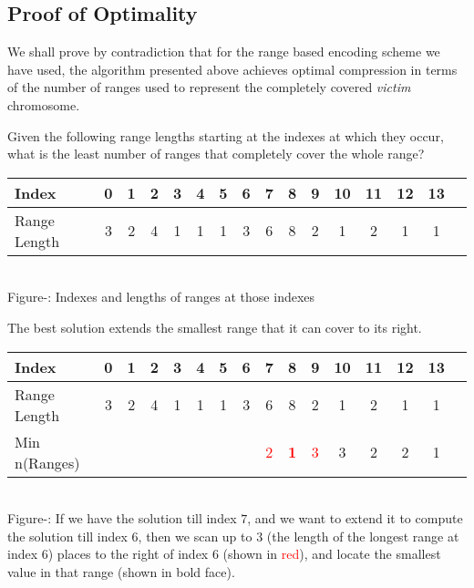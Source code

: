 \documentclass[11pt]{article}
\newcounter{fignum}
\begin{document}
\subsection{Proof of Optimality}

We shall prove by contradiction that for the range based encoding
scheme we have used, the algorithm presented above achieves optimal
compression in terms of the number of ranges used to represent the
completely covered \textit{victim} chromosome.

Given the following range lengths starting at the indexes at which
they occur, what is the least number of ranges that completely cover
the whole range?

\begin{center}
  \begin{tabular}{|l|c|c|c|c|c|c|c|c|c|c|c|c|c|c|c|}
    \hline
    Index        & 0 & 1 & 2 & 3 & 4 & 5 & 6 & 7 & 8 & 9 &10 &11 &12 &13\\
    \hline
    Range Length & 3 & 2 & 4 & 1 & 1 & 1 & 3 & 6 & 8 & 2 & 1 & 2 & 1 & 1\\
    \hline
  \end{tabular}\\
  \vspace{0.3cm}
  \footnotesize{Figure-: Indexes and lengths of ranges
    at those indexes}
  \addtocounter{fignum}{1}
\end{center}

The best solution extends the smallest range that it can cover to its
right.

\begin{center}
  \begin{tabular}{|l|c|c|c|c|c|c|c|c|c|c|c|c|c|c|c|}
    \hline
    Index         & 0 & 1 & 2 & 3 & 4 & 5 & 6 & 7 & 8 & 9 &10 &11 &12 &13\\
    \hline
    Range Length  & 3 & 2 & 4 & 1 & 1 & 1 & 3 & 6 & 8 & 2 & 1 & 2 & 1 & 1\\
    \hline
    Min n(Ranges) &  &  &  &  &  &  &  & \textcolor{red}{2} & \textbf{\textcolor{red}{1}} & \textcolor{red}{3} & 3 & 2 & 2 & 1\\
    \hline
  \end{tabular}\\
  \vspace{0.3cm}
  \footnotesize{Figure-: If we have the solution till index
    $7$, and we want to extend it to compute the solution till index
    $6$, then we scan up to $3$ (the length of the longest range at
    index $6$) places to the right of index $6$ (shown in
    \textcolor{red}{red}), and locate the smallest value in that range
    (shown in bold face).}
  \addtocounter{fignum}{1}
\end{center}
\end{document}
